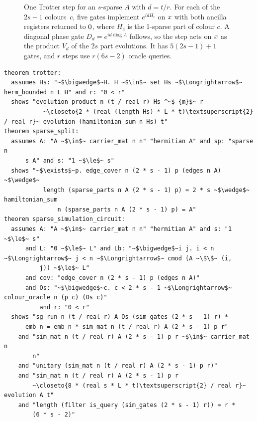 \documentclass[runningheads]{llncs}
\let\ket\relax\let\bra\relax\let\braket\relax\let\ketbra\relax
\newcommand{\ket}[1]{|#1\rangle}
\newcommand{\bra}[1]{\langle #1|}
\newcommand{\braket}[2]{\langle #1|#2\rangle}
\newcommand{\ketbra}[2]{|#1\rangle\langle #2|}
\newcommand{\closeto}[1]{$\approx_{\mbox{\scriptsize\ttfamily #1}}$}
\begin{document}
\begin{figure}[t]
\centering
\scalebox{0.85}{%
\begin{quantikz}[row sep={0.7cm,between origins}, column sep=0.3cm]
\lstick{$\ket x$} & \qwbundle{} & \gate[2]{O_c} & \gate[3]{\mathrm{CMP}} & \gate[3]{\mathrm{ENT}_d} & \gate[3]{\mathrm{CMP}} & \gate[2]{O_c^\dagger} & \midstick[3,brackets=none]{$\cdots$} & \gate{D_d} & \rstick{$V_d\ket x$}\\
\lstick{$\ket 0$} & \qwbundle{} & & & & & & & & \rstick{$\ket0$}\\
\lstick{$\ket 0$} & & & & & & & & & \rstick{$\ket0$}
\end{quantikz}}
\caption{One Trotter step for an $s$-sparse $A$ with $d=t/r$. For each of the $2s-1$ colours~$c$, five
gates implement $e^{idH_c}$ on $\ket x$ with both ancilla registers returned to $\ket0$, where $H_c$ is
the 1-sparse part of colour $c$. A diagonal phase gate $D_d=e^{id\operatorname{diag}A}$ follows, so the
step acts on $\ket x$ as the product $V_d$ of the $2s$ part evolutions. It has $5(2s-1)+1$ gates, and
$r$ steps use $r(6s-2)$ oracle queries.}\label{fig:sparse}
\end{figure}

\begin{lstlisting}[float=tp,caption={Trotter, the colouring, and the sparse simulation circuit},label={lst:sparse}]
theorem trotter:
  assumes Hs: "~$\bigwedge$~H. H ~$\in$~ set Hs ~$\Longrightarrow$~ herm_bounded n L H" and r: "0 < r"
  shows "evolution_product n (t / real r) Hs ^~$_{m}$~ r
           ~\closeto{2 * (real (length Hs) * L * t)\textsuperscript{2} / real r}~ evolution (hamiltonian_sum n Hs) t"
theorem sparse_split:
  assumes A: "A ~$\in$~ carrier_mat n n" "hermitian A" and sp: "sparse n
      s A" and s: "1 ~$\le$~ s"
  shows "~$\exists$~p. edge_cover n (2 * s - 1) p (edges n A) ~$\wedge$~
           length (sparse_parts n A (2 * s - 1) p) = 2 * s ~$\wedge$~ hamiltonian_sum
               n (sparse_parts n A (2 * s - 1) p) = A"
theorem sparse_simulation_circuit:
  assumes A: "A ~$\in$~ carrier_mat n n" "hermitian A" and s: "1 ~$\le$~ s"
      and L: "0 ~$\le$~ L" and Lb: "~$\bigwedge$~i j. i < n ~$\Longrightarrow$~ j < n ~$\Longrightarrow$~ cmod (A ~\$\$~ (i,
          j)) ~$\le$~ L"
      and cov: "edge_cover n (2 * s - 1) p (edges n A)"
      and Os: "~$\bigwedge$~c. c < 2 * s - 1 ~$\Longrightarrow$~ colour_oracle n (p c) (Os c)"
          and r: "0 < r"
  shows "sg_run n (t / real r) A Os (sim_gates (2 * s - 1) r) *
      emb n = emb n * sim_mat n (t / real r) A (2 * s - 1) p r"
    and "sim_mat n (t / real r) A (2 * s - 1) p r ~$\in$~ carrier_mat n
        n"
    and "unitary (sim_mat n (t / real r) A (2 * s - 1) p r)"
    and "sim_mat n (t / real r) A (2 * s - 1) p r
        ~\closeto{8 * (real s * L * t)\textsuperscript{2} / real r}~ evolution A t"
    and "length (filter is_query (sim_gates (2 * s - 1) r)) = r *
        (6 * s - 2)"
\end{lstlisting}
\end{document}
